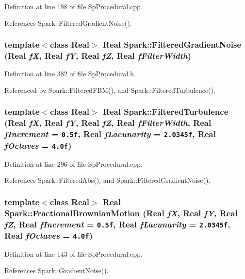Definition at line 188 of file Sp\-Procedural.cpp.

References Spark::Filtered\-Gradient\-Noise().
\subsubsection{\setlength{\rightskip}{0pt plus 5cm}template$<$class Real$>$ Real Spark::Filtered\-Gradient\-Noise (Real {\em f\-X}, Real {\em f\-Y}, Real {\em f\-Z}, Real {\em f\-Filter\-Width})}\label{namespaceSpark_a111}


Definition at line 382 of file Sp\-Procedural.h.

Referenced by Spark::Filtered\-FBM(), and Spark::Filtered\-Turbulence().
\subsubsection{\setlength{\rightskip}{0pt plus 5cm}template$<$class Real$>$ Real Spark::Filtered\-Turbulence (Real {\em f\-X}, Real {\em f\-Y}, Real {\em f\-Z}, Real {\em f\-Filter\-Width}, Real {\em f\-Increment} = {\tt 0.5f}, Real {\em f\-Lacunarity} = {\tt 2.0345f}, Real {\em f\-Octaves} = {\tt 4.0f})}\label{namespaceSpark_a82}


Definition at line 296 of file Sp\-Procedural.cpp.

References Spark::Filtered\-Abs(), and Spark::Filtered\-Gradient\-Noise().
\subsubsection{\setlength{\rightskip}{0pt plus 5cm}template$<$class Real$>$ Real Spark::Fractional\-Brownian\-Motion (Real {\em f\-X}, Real {\em f\-Y}, Real {\em f\-Z}, Real {\em f\-Increment} = {\tt 0.5f}, Real {\em f\-Lacunarity} = {\tt 2.0345f}, Real {\em f\-Octaves} = {\tt 4.0f})}\label{namespaceSpark_a76}


Definition at line 143 of file Sp\-Procedural.cpp.

References Spark::Gradient\-Noise().
